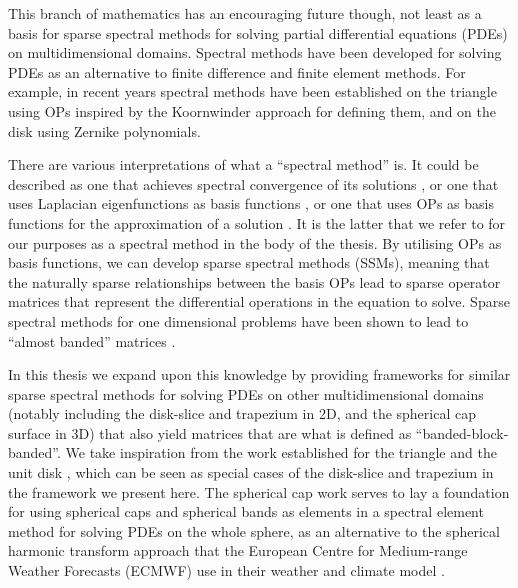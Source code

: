 This branch of mathematics has an encouraging future though, not least as a basis for sparse spectral methods for solving partial differential equations (PDEs) on multidimensional domains. Spectral methods have been developed for solving PDEs as an alternative to finite difference and finite element methods. For example, in recent years spectral methods have been established on the triangle \cite{olver2019triangle} using OPs inspired by the Koornwinder approach for defining them, and on the disk \cite{vasil2016tensor} using Zernike polynomials.

There are various interpretations of what a \enquote{spectral method} is. It could be described as one that achieves spectral convergence of its solutions \cite{gottlieb1977numerical}, or one that uses Laplacian eigenfunctions as basis functions \cite{zhong2007numerical}, or one that uses OPs as basis functions for the approximation of a solution \cite{olver2019triangle}. It is the latter that we refer to for our purposes as a spectral method in the body of the thesis. By utilising OPs as basis functions, we can develop sparse spectral methods (SSMs), meaning that the naturally sparse relationships between the basis OPs lead to sparse operator matrices that represent the differential operations in the equation to solve. Sparse spectral methods for one dimensional problems have been shown to lead to \enquote{almost banded} matrices \cite{olver2013fast}.

In this thesis we expand upon this knowledge by providing frameworks for similar sparse spectral methods for solving PDEs on other multidimensional domains (notably including the disk-slice and trapezium in 2D, and the spherical cap surface in 3D) that also yield matrices that are what is defined as \enquote{banded-block-banded}. We take inspiration from the work established for the triangle \cite{olver2019triangle} and the unit disk \cite{vasil2016tensor}, which can  be seen as special cases of the disk-slice and trapezium in the framework we present here. The spherical cap work serves to lay a foundation for using spherical caps and spherical bands as elements in a spectral element method for solving PDEs on the whole sphere, as an alternative to the spherical harmonic transform approach that the European Centre for Medium-range Weather Forecasts (ECMWF) use in their weather and climate model \cite{cheong2006dynamical}. 

